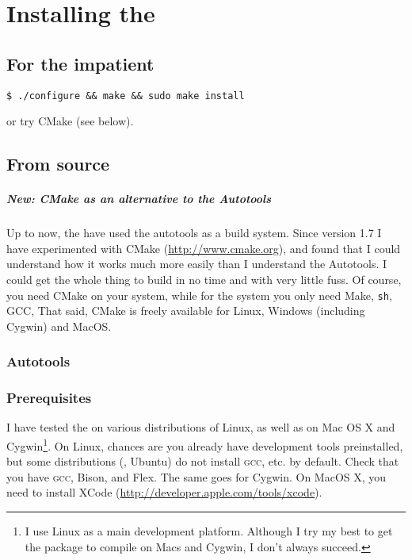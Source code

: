 \chapter{Installing the \nutils}
\label{app:installing}

\section{For the impatient}

\verb+$ ./configure && make && sudo make install+

or try CMake (see below).



\section{From source}

\paragraph{New: CMake as an alternative to the Autotools}
Up to now, the \nutils{} have used the \gnu{} autotools as a build system. Since
version 1.7 I have experimented with CMake (\url{http://www.cmake.org}), and
found that I could understand how it works much more easily than I understand
the Autotools. I could get the whole thing to build in no time and with very
little fuss. Of course, you need CMake on your system, while for the \gnu{}
system you only need Make, \texttt{sh}, GCC, \etc{} That said, CMake is freely
available for Linux, Windows (including Cygwin) and MacOS.

\subsection{\gnu{} Autotools}

\subsection{Prerequisites}

I have tested the \nutils{} on various distributions of Linux, as well as on Mac
OS X and Cygwin\footnote{I use Linux as a main development platform.  Although I
try my best to get the package to compile on Macs and Cygwin, I don't always
succeed.}. On Linux, chances are you already have development tools
preinstalled, but some distributions (\eg, Ubuntu) do not install \textsc{gcc},
etc. by default. Check that you have \textsc{gcc}, Bison, and Flex. The same
goes for Cygwin. On MacOS X, you need to install XCode
(\url{http://developer.apple.com/tools/xcode}).

